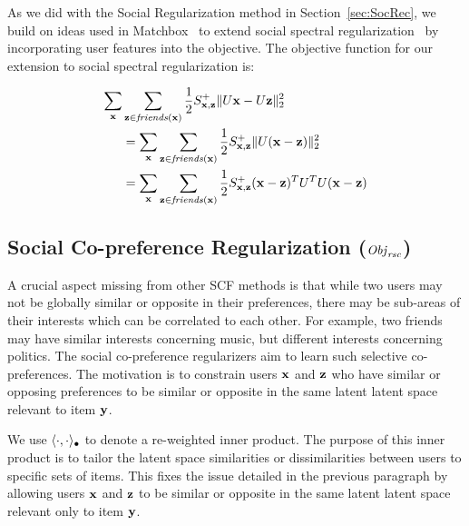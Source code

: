 As we did with the Social Regularization method in Section~\ref{sec:SocRec}, we build on ideas used in Matchbox~\cite{matchbox} to extend social spectral regularization~\cite{sr,rrmf} by incorporating user features into the objective. The objective function for our extension to social spectral regularization is:

\begin{align}
\sum_{\mathbf{x}} & \sum_{\mathbf{z} \in \mathit{friends}(\mathbf{x})} \frac{1}{2} S^+_{\mathbf{x},\mathbf{z}} \| U\mathbf{x} - U\mathbf{z} \|_2^2 \nonumber \\
& = \sum_{\mathbf{x}} \sum_{\mathbf{z} \in \mathit{friends}(\mathbf{x})} \frac{1}{2} S^+_{\mathbf{x},\mathbf{z}} \| U (\mathbf{x} - \mathbf{z}) \|_2^2 \nonumber \\
& = \sum_{\mathbf{x}} \sum_{\mathbf{z} \in \mathit{friends}(\mathbf{x})} \frac{1}{2} S^+_{\mathbf{x},\mathbf{z}} (\mathbf{x} - \mathbf{z})^T U^T U (\mathbf{x} - \mathbf{z})
\end{align}

\subsection{Social Co-preference Regularization ($\mathit{Obj}_{\mathit{rsc}}$)}
\label{sec:rsc}

A crucial aspect missing from other SCF methods is that while two users may not be globally similar or opposite 
in their preferences, there may be sub-areas of their interests which can be correlated to each other.
For example, two friends may have similar interests concerning music, but 
different interests concerning politics.  The social co-preference regularizers
aim to learn such selective co-preferences. The motivation is to constrain users $\mathbf{x}$
and $\mathbf{z}$ who have similar or opposing
preferences to be similar or opposite in the same latent latent space
relevant to item $\mathbf{y}$.  

We use $\langle \cdot, \cdot \rangle_{\bullet}$ to denote a re-weighted inner product. The purpose of this inner product is to tailor the latent space similarities or dissimilarities between users to specific sets of items. This fixes the issue detailed in the previous paragraph by allowing users $\mathbf{x}$
and $\mathbf{z}$ to be similar or opposite in the same latent latent space
relevant only to item $\mathbf{y}$.  

